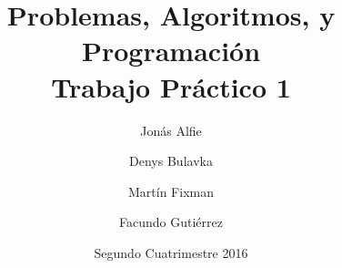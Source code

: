 \documentclass{article}
\title{Problemas, Algoritmos, y Programación \\ Trabajo Práctico 1}
\author{Jonás Alfie \and Denys Bulavka \and Martín Fixman \and Facundo Gutiérrez}
\date{Segundo Cuatrimestre 2016}
\begin{document}
\maketitle{}

\newpage{}
\end{document}
